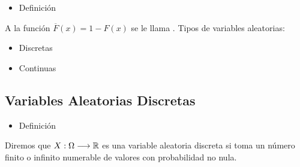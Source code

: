 \begin{itemize}[label=\color{red}\textbullet, leftmargin=*]
	\item \color{lightblue}Definición
\end{itemize}
A la función $\overline{F}(x)=1-F(x)$ se le llama . Tipos de variables aleatorias:
\begin{itemize}
	\item Discretas
	\item Continuas
\end{itemize}
\subsection{Variables Aleatorias Discretas}
\begin{itemize}[label=\color{red}\textbullet, leftmargin=*]
	\item \color{lightblue}Definición
\end{itemize}
Diremos que $X:\Omega\longrightarrow\operatorname{\mathbb{R}}$ es una variable aleatoria discreta si toma un número finito o infinito numerable de valores con probabilidad no nula.

